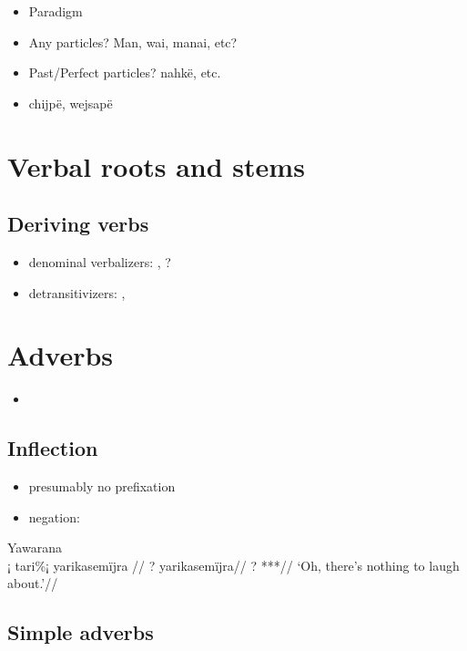\documentclass{memoir}
\begin{document}
\begin{itemize}
\tightlist
\item
  Paradigm
\item
  Any particles? Man, wai, manai, etc?
\item
  Past/Perfect particles? nahkë, etc.
\item
  chijpë, wejsapë
\end{itemize}

\chapter{\texorpdfstring{Verbal roots and stems
\label{derbderiv}}{Verbal roots and stems }}

\section{Deriving verbs}

\begin{itemize}
\tightlist
\item
  denominal verbalizers: , ?
\item
  detransitivizers: , 
\end{itemize}

\chapter{\texorpdfstring{Adverbs \label{adverbs}}{Adverbs }}

\begin{itemize}
\tightlist
\item
\end{itemize}

\section{Inflection}

\begin{itemize}
\tightlist
\item
  presumably no prefixation
\item
  negation:
\end{itemize}

\ex Yawarana \\
\label{convrisamaj-52}    \begingl
    \glpreamble ¡ tari\%¡ yarikasemïjra //
    \gla ? yarikasemïjra//
    \glb ? ***//
        \glft ‘Oh, there’s nothing to laugh about.’//  
    \endgl 
\xe

\section{\texorpdfstring{Simple adverbs
\label{sec:simpleadv}}{Simple adverbs }}
\end{document}
